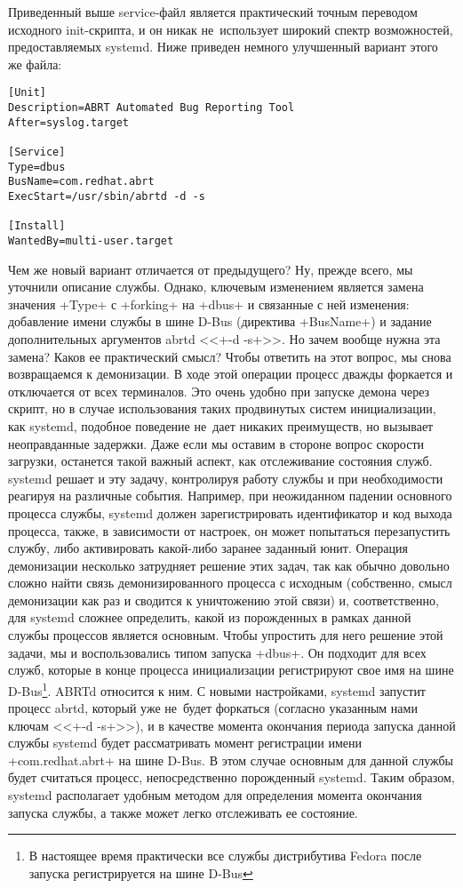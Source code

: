 \documentclass[10pt,oneside,a4paper]{article}
\begin{document}
Приведенный выше service-файл является практический точным переводом
исходного init-скрипта, и он никак не~использует широкий спектр возможностей,
предоставляемых systemd. Ниже приведен немного улучшенный вариант этого же
файла: 

\begin{Verbatim}
[Unit]
Description=ABRT Automated Bug Reporting Tool
After=syslog.target

[Service]
Type=dbus
BusName=com.redhat.abrt
ExecStart=/usr/sbin/abrtd -d -s

[Install]
WantedBy=multi-user.target
\end{Verbatim}

Чем же новый вариант отличается от предыдущего? Ну, прежде всего, мы уточнили
описание службы. Однако, ключевым изменением является замена значения +Type+ с +forking+
на +dbus+ и связанные с ней изменения: добавление имени службы в шине D-Bus
(директива +BusName+) и задание дополнительных аргументов abrtd <<+-d -s+>>. Но
зачем вообще нужна эта замена? Каков ее практический смысл? Чтобы ответить на
этот вопрос, мы снова возвращаемся к демонизации. В ходе этой операции процесс
дважды форкается и отключается от всех терминалов. Это очень удобно при запуске
демона через скрипт, но в случае использования таких продвинутых систем
инициализации, как systemd, подобное поведение не~дает никаких преимуществ, но
вызывает неоправданные задержки. Даже если мы оставим в стороне вопрос скорости
загрузки, останется такой важный аспект, как отслеживание состояния служб.
systemd решает и эту задачу, контролируя работу службы и при необходимости
реагируя на различные события. Например, при неожиданном падении основного
процесса службы, systemd должен зарегистрировать идентификатор и код выхода
процесса, также, в зависимости от настроек, он может попытаться перезапустить
службу, либо активировать какой-либо заранее заданный юнит. Операция
демонизации несколько затрудняет решение этих задач, так как обычно довольно
сложно найти связь демонизированного процесса с исходным (собственно, смысл
демонизации как раз и сводится к уничтожению этой связи) и, соответственно, для
systemd сложнее определить, какой из порожденных в рамках данной службы
процессов является основным. Чтобы упростить для него решение этой задачи, мы и
воспользовались типом запуска +dbus+. Он подходит для всех служб, которые в
конце процесса инициализации регистрируют свое имя на шине D-Bus\footnote{В
настоящее время практически все службы дистрибутива Fedora после запуска
регистрируется на шине D-Bus}. ABRTd относится к ним.  С новыми настройками,
systemd запустит процесс abrtd, который уже не~будет форкаться (согласно
указанным нами ключам <<+-d -s+>>), и в качестве момента окончания периода
запуска данной службы systemd будет рассматривать момент регистрации имени
+com.redhat.abrt+ на шине D-Bus. В этом случае основным для данной службы будет
считаться процесс, непосредственно порожденный systemd.  Таким образом, systemd
располагает удобным методом для определения момента окончания запуска службы, а
также может легко отслеживать ее состояние. 
\end{document}
